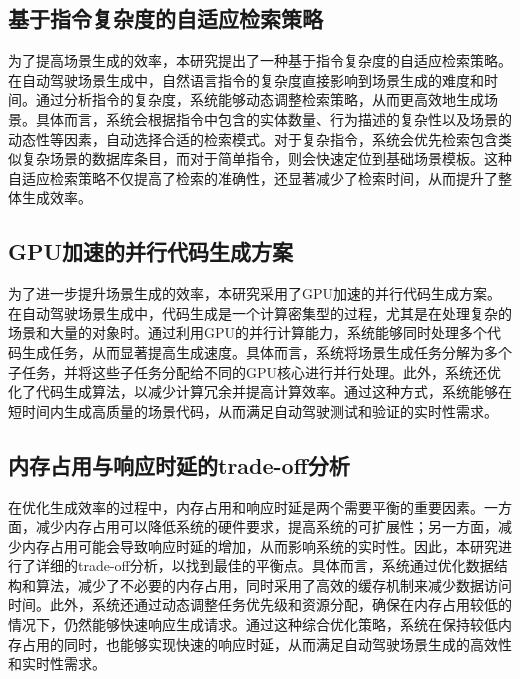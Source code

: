 \subsection{基于指令复杂度的自适应检索策略}
为了提高场景生成的效率，本研究提出了一种基于指令复杂度的自适应检索策略。在自动驾驶场景生成中，自然语言指令的复杂度直接影响到场景生成的难度和时间。通过分析指令的复杂度，系统能够动态调整检索策略，从而更高效地生成场景。具体而言，系统会根据指令中包含的实体数量、行为描述的复杂性以及场景的动态性等因素，自动选择合适的检索模式。对于复杂指令，系统会优先检索包含类似复杂场景的数据库条目，而对于简单指令，则会快速定位到基础场景模板。这种自适应检索策略不仅提高了检索的准确性，还显著减少了检索时间，从而提升了整体生成效率。
\subsection{GPU加速的并行代码生成方案}
为了进一步提升场景生成的效率，本研究采用了GPU加速的并行代码生成方案。在自动驾驶场景生成中，代码生成是一个计算密集型的过程，尤其是在处理复杂的场景和大量的对象时。通过利用GPU的并行计算能力，系统能够同时处理多个代码生成任务，从而显著提高生成速度。具体而言，系统将场景生成任务分解为多个子任务，并将这些子任务分配给不同的GPU核心进行并行处理。此外，系统还优化了代码生成算法，以减少计算冗余并提高计算效率。通过这种方式，系统能够在短时间内生成高质量的场景代码，从而满足自动驾驶测试和验证的实时性需求。
\subsection{内存占用与响应时延的trade-off分析}
在优化生成效率的过程中，内存占用和响应时延是两个需要平衡的重要因素。一方面，减少内存占用可以降低系统的硬件要求，提高系统的可扩展性；另一方面，减少内存占用可能会导致响应时延的增加，从而影响系统的实时性。因此，本研究进行了详细的trade-off分析，以找到最佳的平衡点。具体而言，系统通过优化数据结构和算法，减少了不必要的内存占用，同时采用了高效的缓存机制来减少数据访问时间。此外，系统还通过动态调整任务优先级和资源分配，确保在内存占用较低的情况下，仍然能够快速响应生成请求。通过这种综合优化策略，系统在保持较低内存占用的同时，也能够实现快速的响应时延，从而满足自动驾驶场景生成的高效性和实时性需求。
